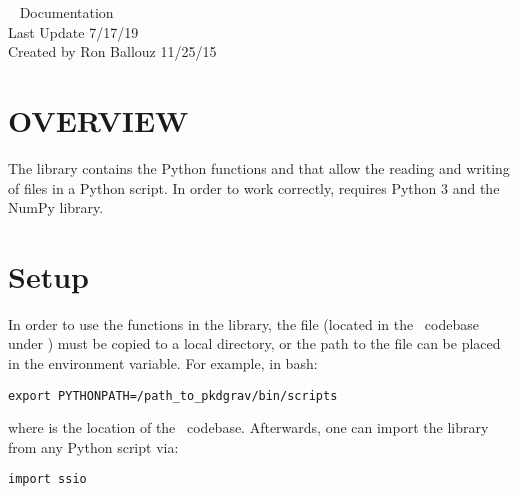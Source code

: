 



\begin{flushleft}

\huge{\pkd\  Documentation}\\
\bigskip\bigskip
\Large{Last Update 7/17/19}\\
\bigskip\bigskip
\large{Created by Ron Ballouz 11/25/15}\\

\end{flushleft}

\section{OVERVIEW}

The  library contains the Python
functions  and  that allow the
reading and writing of  files in a Python script.  In order
to work correctly,  requires Python 3 and the NumPy
library.

\section{Setup}
In order to use the functions in the  library, the file
(located in the \pkd\ codebase under ) must be
copied to a local directory, or the path to the file can be placed in
the  environment variable.  For example, in bash:
\begin{verbatim}
export PYTHONPATH=/path_to_pkdgrav/bin/scripts
\end{verbatim}
where  is the location of the \pkd\ codebase.
Afterwards, one can import the  library from any Python
script via:
\begin{verbatim}
import ssio
\end{verbatim}

